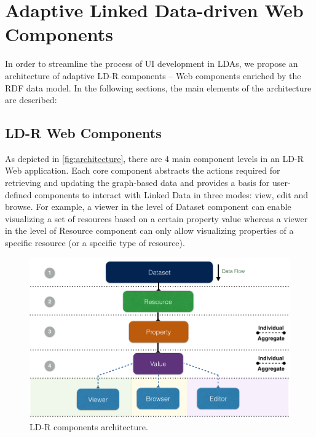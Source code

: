 \documentclass{acm_proc_article-sp}
\begin{document}
\section{Adaptive Linked Data-driven Web Components}
In order to streamline the process of UI development in LDAs, we propose an architecture of adaptive LD-R components -- Web components enriched by the RDF data model.
In the following sections, the main elements of the architecture are described:

\subsection{LD-R Web Components}
As depicted in \autoref{fig:architecture}, there are 4 main component levels in an LD-R Web application.
Each core component abstracts the actions required for retrieving and updating the graph-based data and provides a basis for user-defined components to interact with Linked Data in three modes: view, edit and browse.
For example, a viewer in the level of Dataset component can enable visualizing a set of resources based on a certain property value whereas a viewer in the level of Resource component can only allow visualizing properties of a specific resource (or a specific type of resource).

\begin{figure}[htb]
  \includegraphics[width=1\linewidth]{images/architecture.jpg}
  \caption{LD-R components architecture.}
  \label{fig:architecture}
\end{figure}
\end{document}
